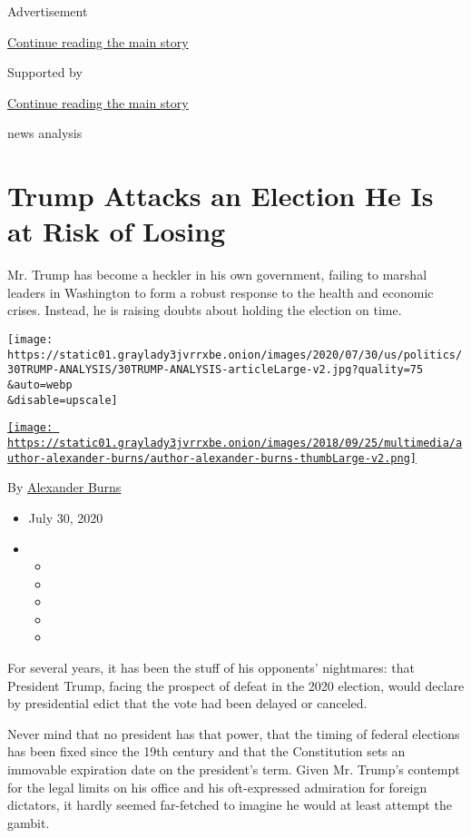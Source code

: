 Advertisement

\protect\hyperlink{after-top}{Continue reading the main story}

Supported by

\protect\hyperlink{after-sponsor}{Continue reading the main story}

news analysis

\hypertarget{trump-attacks-an-election-he-is-at-risk-of-losing}{%
\section{Trump Attacks an Election He Is at Risk of
Losing}\label{trump-attacks-an-election-he-is-at-risk-of-losing}}

Mr. Trump has become a heckler in his own government, failing to marshal
leaders in Washington to form a robust response to the health and
economic crises. Instead, he is raising doubts about holding the
election on time.

\texttt{[image: https://static01.graylady3jvrrxbe.onion/images/2020/07/30/us/politics/30TRUMP-ANALYSIS/30TRUMP-ANALYSIS-articleLarge-v2.jpg?quality=75\\\&auto=webp\\\&disable=upscale]}

\href{https://www.nytimes3xbfgragh.onion/by/alexander-burns}{\texttt{[image: https://static01.graylady3jvrrxbe.onion/images/2018/09/25/multimedia/author-alexander-burns/author-alexander-burns-thumbLarge-v2.png]}}

By
\href{https://www.nytimes3xbfgragh.onion/by/alexander-burns}{Alexander
Burns}

\begin{itemize}
\item
  July 30, 2020
\item
  \begin{itemize}
  \item
  \item
  \item
  \item
  \item
  \end{itemize}
\end{itemize}

For several years, it has been the stuff of his opponents' nightmares:
that President Trump, facing the prospect of defeat in the 2020
election, would declare by presidential edict that the vote had been
delayed or canceled.

Never mind that no president has that power, that the timing of federal
elections has been fixed since the 19th century and that the
Constitution sets an immovable expiration date on the president's term.
Given Mr. Trump's contempt for the legal limits on his office and his
oft-expressed admiration for foreign dictators, it hardly seemed
far-fetched to imagine he would at least attempt the gambit.


